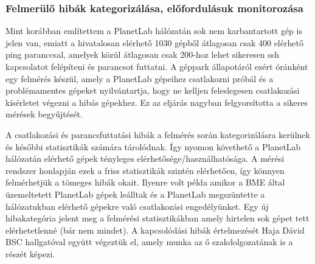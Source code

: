 \subsubsection*{Felmerülő hibák kategorizálása, előfordulásuk monitorozása}
Mint korábban említettem a PlanetLab hálózatán sok nem karbantartott gép is jelen van, emiatt a hivatalosan elérhető 1030 gépből átlagosan csak 400 elérhető ping paranccsal, amelyek közül átlagosan csak 200-hoz lehet sikeresen ssh kapcsolatot felépíteni és parancsot futtatni. A géppark állapotáról ezért óránként egy felmérés készül, amely a PlanetLab gépeihez csatlakozni próbál és a problémamentes gépeket nyilvántartja, hogy ne kelljen feleslegesen csatlakozási kísérletet végezni a hibás gépekhez. Ez az eljárás nagyban felgyorsította a sikeres mérések begyűjtését.

A csatlakozási és parancsfuttatási hibák a felmérés során kategorizálásra kerülnek és későbbi statisztikák számára tárolódnak. Így nyomon követhető a PlanetLab hálózatán elérhető gépek tényleges elérhetősége/használhatósága.
A mérési rendszer honlapján ezek a friss statisztikák szintén elérhetően, így könnyen felmérhetjük a tömeges hibák okait. Ilyenre volt példa amikor a BME által üzemeltetett PlanetLab gépek leálltak és a PlanetLab megszüntette a hálózatukban elérhető gépekre való csatlakozási engedélyünket. Egy új hibakategória jelent meg a felmérési statisztikákban amely hirtelen sok gépet tett elérhetetlenné (bár nem mindet). A kapcsolódási hibák értelmezését Haja Dávid BSC hallgatóval együtt végeztük el, amely munka az ő szakdolgozatának is a részét képezi.
